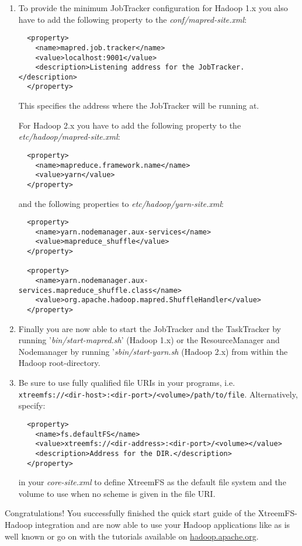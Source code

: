 \documentclass[a4paper,10pt]{book}
\begin{document}
\begin{enumerate}
\item To provide the minimum JobTracker configuration for Hadoop 1.x you also have to add the following property to the
	\textit{conf/mapred-site.xml}:

	\begin{verbatim}
  <property>
    <name>mapred.job.tracker</name>
    <value>localhost:9001</value>
    <description>Listening address for the JobTracker.</description>
  </property>
	\end{verbatim}
	This specifies the address where the JobTracker will be running at.

For Hadoop 2.x you have to add the following property to the \textit{etc/hadoop/mapred-site.xml}:

	\begin{verbatim}
  <property>
    <name>mapreduce.framework.name</name>
    <value>yarn</value>
  </property>
	\end{verbatim}

    and the following properties to \textit{etc/hadoop/yarn-site.xml}:

   \begin{verbatim}
  <property>
    <name>yarn.nodemanager.aux-services</name>
    <value>mapreduce_shuffle</value>
  </property>

  <property>
    <name>yarn.nodemanager.aux-services.mapreduce_shuffle.class</name>
    <value>org.apache.hadoop.mapred.ShuffleHandler</value>
  </property>
   \end{verbatim}
\item Finally you are now able to start the JobTracker and the TaskTracker by running '\textit{bin/start-mapred.sh}' (Hadoop 1.x) or the ResourceManager and Nodemanager by running '\textit{sbin/start-yarn.sh} (Hadoop 2.x) from within the Hadoop root-directory.

\item Be sure to use fully qualified file URIs in your programs, i.e.\\\texttt{xtreemfs://<dir-host>:<dir-port>/<volume>/path/to/file}. Alternatively, specify:

  \begin{verbatim}
  <property>
    <name>fs.defaultFS</name>
    <value>xtreemfs://<dir-address>:<dir-port>/<volume></value>
    <description>Address for the DIR.</description>
  </property>
  \end{verbatim}

  in your \textit{core-site.xml} to define XtreemFS as the default file system and the volume to use when no scheme is given in the file URI.

\end{enumerate}
Congratulations! You successfully finished the quick start guide of the XtreemFS-Hadoop integration and are now able to use your Hadoop applications like as is well known or go on with the tutorials available on \href{http://hadoop.apache.org}{hadoop.apache.org}.
\end{document}
